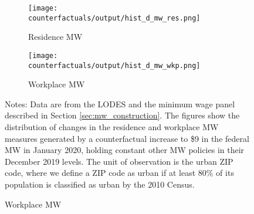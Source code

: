 \begin{figure}[h!]
    \centering
    \caption{Distribution of counterfactual increases in MW measures, 
                urban ZIP codes}
    \label{fig:cf_hist_res_and_wkp_mw}
    \begin{subfigure}{0.5\textwidth}
        \caption*{Residence MW}
        \texttt{[image: counterfactuals/output/hist\_d\_mw\_res.png]}
    \end{subfigure}%
    \begin{subfigure}{0.5\textwidth}
        \caption*{Workplace MW}
        \texttt{[image: counterfactuals/output/hist\_d\_mw\_wkp.png]}
    \end{subfigure}

    \begin{minipage}{.95\textwidth} \footnotesize
        \vspace{3mm}
        Notes:
        Data are from the LODES and the minimum wage panel described in Section 
        \ref{sec:mw_construction}.
        The figures show the distribution of changes in the residence and 
        workplace MW measures generated by a counterfactual increase to \$9 
        in the federal MW in January 2020, holding constant other MW policies 
        in their December 2019 levels.
        The unit of observation is the urban ZIP code, where we define a ZIP code 
        as urban if at least 80\% of its population is classified as urban by
        the 2010 Census.
    \end{minipage}
\end{figure}
